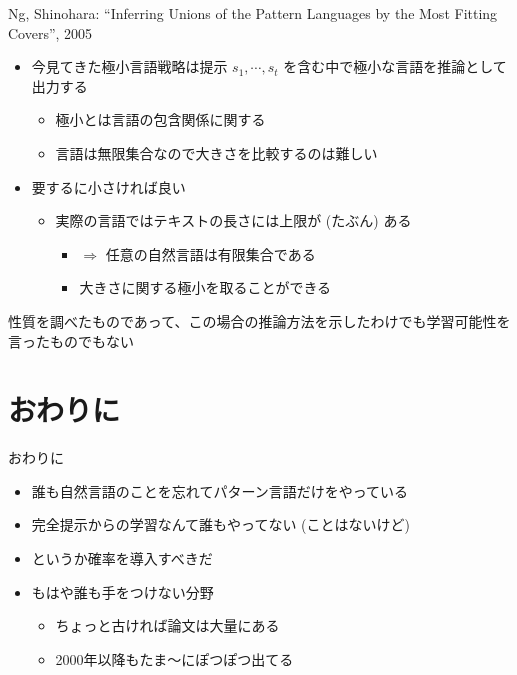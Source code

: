 \documentclass[professionalfont, 12pt, dvipdfmx, default, cjk]{beamer}
\begin{document}
\begin{frame}{Ng, Shinohara: ``Inferring Unions of the Pattern Languages
by the Most Fitting Covers'', 2005}

\begin{itemize}
\itemsep1pt\parskip0pt
\item
  今見てきた極小言語戦略は提示 \(s_1, \cdots, s_t\)
  を含む中で極小な言語を推論として出力する

  \begin{itemize}
  \itemsep1pt\parskip0pt
  \item
    極小とは言語の包含関係に関する
  \item
    言語は無限集合なので大きさを比較するのは難しい
  \end{itemize}
\item
  要するに小さければ良い

  \begin{itemize}
  \itemsep1pt\parskip0pt
  \item
    実際の言語ではテキストの長さには上限が (たぶん) ある

    \begin{itemize}
    \itemsep1pt\parskip0pt
    \item
      \(\Rightarrow\) 任意の自然言語は有限集合である
    \item
      大きさに関する極小を取ることができる
    \end{itemize}
  \end{itemize}
\end{itemize}

性質を調べたものであって、この場合の推論方法を示したわけでも学習可能性を言ったものでもない

\end{frame}

\section{おわりに}\label{ux304aux308fux308aux306b}

\begin{frame}{おわりに}

\begin{itemize}
\itemsep1pt\parskip0pt
\item
  誰も自然言語のことを忘れてパターン言語だけをやっている
\item
  完全提示からの学習なんて誰もやってない (ことはないけど)
\item
  というか確率を導入すべきだ
\item
  もはや誰も手をつけない分野

  \begin{itemize}
  \itemsep1pt\parskip0pt
  \item
    ちょっと古ければ論文は大量にある
  \item
    2000年以降もたま〜にぽつぽつ出てる
  \end{itemize}
\end{itemize}

\end{frame}
\end{document}
